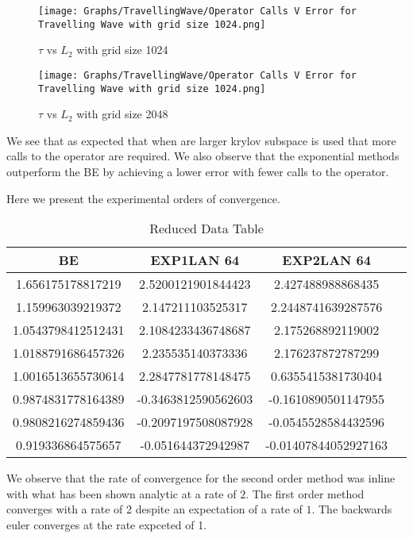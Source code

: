 \begin{figure}[H]
    \centering
    \begin{minipage}{0.49\textwidth}
        \texttt{[image: Graphs/TravellingWave/Operator Calls V Error for Travelling Wave with grid size 1024.png]} %
        \caption{$\tau$ vs $L_2$ with grid size 1024}
        \label{fig:plot1}
    \end{minipage}\hfill
    \centering
    \begin{minipage}{0.49\textwidth}
        \texttt{[image: Graphs/TravellingWave/Operator Calls V Error for Travelling Wave with grid size 1024.png]} %
        \caption{$\tau$ vs $L_2$ with grid size 2048}
        \label{fig:plot2}
    \end{minipage}\hfill
\end{figure}

We see that as expected that when are larger krylov subspace is used that more calls to the operator are required.
We also observe that the exponential methods outperform the BE by achieving a lower error with fewer calls to the operator.

Here we present the experimental orders of convergence.

\begin{table}[H]
    \centering
    \begin{tabular}{| c | c | c | c}
    \hline
    BE & EXP1LAN 64 & EXP2LAN 64 \\
    \hline
    1.656175178817219 & 2.5200121901844423 & 2.427488988868435 \\
    1.159963039219372 & 2.147211103525317 & 2.2448741639287576 \\
    1.0543798412512431 & 2.1084233436748687 & 2.175268892119002 \\
    1.0188791686457326 & 2.235535140373336 & 2.176237872787299 \\
    1.0016513655730614 & 2.2847781778148475 & 0.6355415381730404 \\
    0.9874831778164389 & -0.3463812590562603 & -0.1610890501147955 \\
    0.9808216274859436 & -0.2097197508087928 & -0.0545528584432596 \\
    0.919336864575657 & -0.051644372942987 & -0.01407844052927163 \\
    \hline
    \end{tabular}
    \caption{Reduced Data Table}
    \label{tab:reduced_data}
\end{table}

    


We observe that the rate of convergence for the second order method was inline with what has been shown analytic\cite{Huang2022} at a rate of $2$.
The first order method converges with a rate of 2 despite an expectation of a rate of $1$\cite{Huang2022}.
The backwards euler converges at the rate expceted of 1.